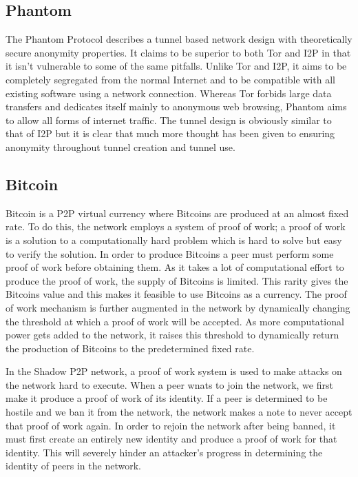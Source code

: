 \documentclass[ %
                    author={Luke Murray},
                supervisor={Dr. Simon Hollis},
                     title={Shadow Peer-to-Peer Networks},
                  subtitle={},
                    degree={MEng},
                      year={2013} ]{thesis}
\begin{document}
\subsection{Phantom}

The Phantom Protocol\cite{Phantom} describes a tunnel based network design with theoretically secure anonymity properties. It claims to be superior to both Tor and I2P in that it isn't vulnerable to some of the same pitfalls. Unlike Tor and I2P, it aims to be completely segregated from the normal Internet and to be compatible with all existing software using a network connection. Whereas Tor forbids large data transfers and dedicates itself mainly to anonymous web browsing, Phantom aims to allow all forms of internet traffic. The tunnel design is obviously similar to that of I2P but it is clear that much more thought has been given to ensuring anonymity throughout tunnel creation and tunnel use.


\subsection{Bitcoin}

Bitcoin\cite{Bitcoin} is a P2P virtual currency where Bitcoins are produced at an almost fixed rate. To do this, the network employs a system of proof of work; a proof of work is a solution to a computationally hard problem which is hard to solve but easy to verify the solution. In order to produce Bitcoins a peer must perform some proof of work before obtaining them. As it takes a lot of computational effort to produce the proof of work, the supply of Bitcoins is limited. This rarity gives the Bitcoins value and this makes it feasible to use Bitcoins as a currency. The proof of work mechanism is further augmented in the network by dynamically changing the threshold at which a proof of work will be accepted. As more computational power gets added to the network, it raises this threshold to dynamically return the production of Bitcoins to the predetermined fixed rate.

In the Shadow P2P network, a proof of work system is used to make attacks on the network hard to execute. When a peer wnats to join the network, we first make it produce a proof of work of its identity. If a peer is determined to be hostile and we ban it from the network, the network makes a note to never accept that proof of work again. In order to rejoin the network after being banned, it must first create an entirely new identity and produce a proof of work for that identity. This will severely hinder an attacker's progress in determining the identity of peers in the network.
\end{document}
